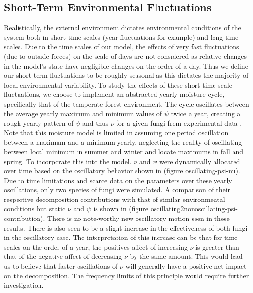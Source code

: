 \documentclass[12pt]{article}
\begin{document}
\begin{multicols}{2}
\subsection{Short-Term Environmental Fluctuations}
Realistically, the external environment dictates environmental conditions of the system both in short time scales (year fluctuations for example) and long time scales. Due to the time scales of our model, the effects of very fast fluctuations (due to outside forces) on the scale of days are not considered as relative changes in the model's state have negligible changes on the order of a day. Thus we define our short term fluctuations to be roughly seasonal as this dictates the majority of local environmental variability. To study the effects of these short time scale fluctuations, we choose to implement an abstracted yearly moisture cycle, specifically that of the temperate forest environment. The cycle oscillates between the average yearly maximum and minimum values of $\psi$ twice a year, creating a rough yearly pattern of $\psi$ and thus $\nu$ for a given fungi from experimental data \cite{Zobel2001}\cite{Maynard2019}. Note that this moisture model is limited in assuming one period oscillation between a maximum and a minimum yearly, neglecting the reality of oscillating between local minimum in summer and winter and locate maximums in fall and spring. To incorporate this into the model, $\nu$ and $\psi$ were dynamically allocated over time based on the oscillatory behavior shown in (figure oscillating-psi-nu). Due to time limitations and scarce data on the parameters over these yearly oscillations, only two species of fungi were simulated. A comparison of their respective decomposition contributions with that of similar environmental conditions but static $\nu$ and $\psi$ is shown in (figure oscillating2nonoscillating-psi-contribution). There is no note-worthy new oscillatory motion seen in these results. There is also seen to be a slight increase in the effectiveness of both fungi in the oscillatory case. The interpretation of this increase can be that for time scales on the order of a year, the positives affect of increasing $\nu$ is greater than that of the negative affect of decreasing $\nu$ by the same amount. This would lead us to believe that faster oscillations of $\nu$ will generally have a positive net impact on the decomposition. The frequency limits of this principle would require further investigation.


\end{multicols}
\end{document}
